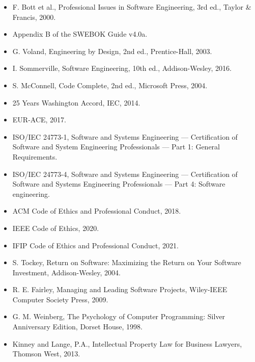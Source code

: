 \documentclass[uplatex,dvipdfmx,a4paper,11pt]{jsarticle}
\begin{document}
\begin{itemize}[leftmargin=2em]

\item F. Bott et al., Professional Issues in Software Engineering, 3rd ed., Taylor \& Francis, 2000.

\item Appendix B of the SWEBOK Guide v4.0a.

\item G. Voland, Engineering by Design, 2nd ed., Prentice-Hall, 2003.

\item I. Sommerville, Software Engineering, 10th ed., Addison-Wesley, 2016.

\item S. McConnell, Code Complete, 2nd ed., Microsoft Press, 2004.

\item 25 Years Washington Accord, IEC, 2014.

\item EUR-ACE, 2017.

\item ISO/IEC 24773-1, Software and Systems Engineering — Certification of Software and System Engineering Professionals — Part 1: General Requirements.

\item ISO/IEC 24773-4, Software and Systems Engineering — Certification of Software and Systems Engineering Professionals — Part 4: Software engineering.

\item ACM Code of Ethics and Professional Conduct, 2018.

\item IEEE Code of Ethics, 2020.

\item IFIP Code of Ethics and Professional Conduct, 2021.

\item S. Tockey, Return on Software: Maximizing the Return on Your Software Investment, Addison-Wesley, 2004.

\item R. E. Fairley, Managing and Leading Software Projects, Wiley-IEEE Computer Society Press, 2009.

\item G. M. Weinberg, The Psychology of Computer Programming: Silver Anniversary Edition, Dorset House, 1998.

\item Kinney and Lange, P.A., Intellectual Property Law for Business Lawyers, Thomson West, 2013.

\end{itemize}
\end{document}
